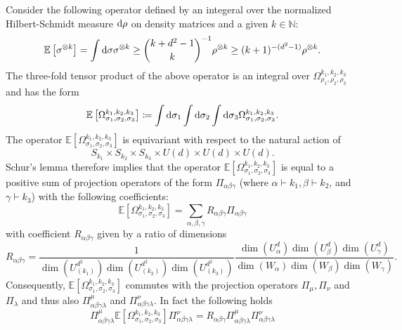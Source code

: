 \documentclass[notitlepage, 10pt]{article}
\begin{document}
Consider the following operator defined by an integeral over the normalized Hilbert-Schmidt measure $\mathrm{d} \rho$ on density matrices and a given $k \in \mathbb N$:
\begin{equation}
    \mathbb E\left[ \sigma^{\otimes k} \right] = \int \mathrm{d} \sigma \sigma^{\otimes k} \geq \binom{k+d^2-1}{k}^{-1} \rho^{\otimes k} \geq (k+1)^{-(d^2-1)} \rho^{\otimes k}.
\end{equation}
The three-fold tensor product of the above operator is an integral over $\Omega_{\rho_1,\rho_2,\rho_3}^{k_1, k_2, k_3}$ and has the form
\begin{equation}
    \mathbb E\left[\Omega_{\sigma_1,\sigma_2,\sigma_3}^{k_1, k_2, k_3}\right] \coloneqq \int \mathrm{d} \sigma_1 \int \mathrm{d} \sigma_2 \int \mathrm{d} \sigma_3 \Omega_{\sigma_1,\sigma_2,\sigma_3}^{k_1, k_2, k_3}.
\end{equation}
The operator $\mathbb E\left[\Omega_{\sigma_1,\sigma_2,\sigma_3}^{k_1, k_2, k_3}\right]$ is equivariant with respect to the natural action of 
\begin{equation}
    S_{k_1} \times S_{k_2} \times S_{k_3} \times U(d) \times U(d) \times U(d).
\end{equation}
Schur's lemma therefore implies that the operator $\mathbb E\left[\Omega_{\sigma_1,\sigma_2,\sigma_3}^{k_1, k_2, k_3}\right]$ is equal to a positive sum of projection operators of the form $\Pi_{\alpha\beta\gamma}$ (where $\alpha \vdash k_1, \beta \vdash k_2$, and $\gamma \vdash k_3$) with the following coefficients:
\begin{equation}
    \label{eq:mean_tensor_power_decomp}
    \mathbb E\left[\Omega_{\sigma_1,\sigma_2,\sigma_3}^{k_1, k_2, k_3}\right] = \sum_{\alpha,\beta,\gamma} R_{\alpha\beta \gamma}\Pi_{\alpha\beta\gamma}
\end{equation}
with coefficient $R_{\alpha \beta \gamma}$ given by a ratio of dimensions
\begin{equation}
    R_{\alpha \beta \gamma} 
    =
    \frac{1}{\dim(U^{d^2}_{(k_1)})\dim(U^{d^2}_{(k_2)})\dim(U^{d^2}_{(k_3)})} 
    \frac{\dim(U^d_\alpha)\dim(U^d_{\beta})\dim(U^d_{\gamma})}{\dim(W_\alpha)\dim(W_{\beta})\dim(W_{\gamma})}.
\end{equation}
Consequently, $\mathbb E\left[\Omega_{\sigma_1,\sigma_2,\sigma_3}^{k_1, k_2, k_3}\right]$ commutes with the projection operators $\Pi_{\mu}, \Pi_{\nu}$ and $\Pi_{\lambda}$ and thus also $\Pi_{\alpha\beta\gamma\lambda}^{\mu}$ and $\Pi_{\alpha\beta\gamma\lambda}^{\nu}$.
In fact the following holds
\begin{equation}
    \Pi_{\alpha\beta\gamma\lambda}^{\mu}\mathbb E\left[\Omega_{\sigma_1,\sigma_2,\sigma_3}^{k_1, k_2, k_3}\right]\Pi_{\alpha\beta\gamma\lambda}^{\nu} = R_{\alpha\beta\gamma} \Pi_{\alpha\beta\gamma\lambda}^{\mu}\Pi_{\alpha\beta\gamma\lambda}^{\nu}
\end{equation}
\end{document}
